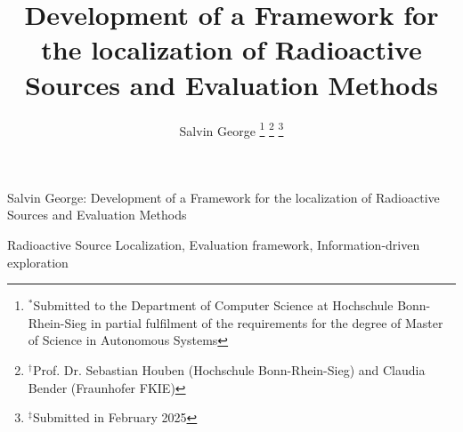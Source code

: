 \documentclass[lettersize,journal]{IEEEtran}
\begin{document}
\title{Development of a Framework for the localization of Radioactive Sources and Evaluation Methods}

\author{Salvin George
\thanks{$^*$Submitted to the Department of Computer Science at Hochschule Bonn-Rhein-Sieg in partial fulfilment of the requirements for the degree of Master of Science in Autonomous Systems}
\thanks{$^{\dagger}$Prof. Dr. Sebastian Houben (Hochschule Bonn-Rhein-Sieg) and Claudia Bender (Fraunhofer FKIE)}
\thanks{$^{\ddagger}$Submitted in February 2025}} %

%
{Salvin George: Development of a Framework for the localization of Radioactive Sources and Evaluation Methods}

\maketitle



\begin{IEEEkeywords}
Radioactive Source Localization, Evaluation framework, Information-driven exploration
\end{IEEEkeywords}



% 









% 
\end{document}
